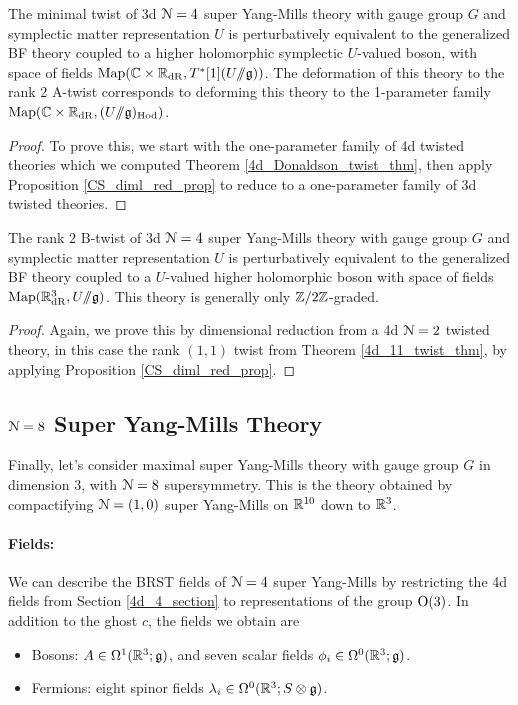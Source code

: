 \documentclass[10pt, oneside]{article}
\newcommand{\ham}{/\!\!/}
\begin{document}
\begin{theorem} \label{3d_4_holo_A_twist_thm}
The minimal twist of 3d $\mathcal{N}=4$ super Yang-Mills theory with gauge group $G$ and symplectic matter representation $U$ is perturbatively equivalent to the generalized BF theory coupled to a higher holomorphic symplectic $U$-valued boson, with space of fields $\mr{Map}(\CC \times \RR_{\mr{dR}}, T^*[1](U\ham \gg))$. The deformation of this theory to the rank 2 A-twist corresponds to deforming this theory to the 1-parameter family $\mr{Map}(\CC \times \RR_{\mr{dR}}, (U\ham \gg)_{\mr{Hod}})$.
\end{theorem}

\begin{proof}
To prove this, we start with the one-parameter family of 4d twisted theories which we computed Theorem \ref{4d_Donaldson_twist_thm}, then apply Proposition \ref{CS_diml_red_prop} to reduce to a one-parameter family of 3d twisted theories.
\end{proof}

\begin{theorem} \label{3d_2_B_twist_thm}
The rank $2$ B-twist of 3d $\mathcal{N}=4$ super Yang-Mills theory with gauge group $G$ and symplectic matter representation $U$ is perturbatively equivalent to the generalized BF theory coupled to a $U$-valued higher holomorphic boson with space of fields $\mr{Map}(\RR^3_{\mr{dR}}, U\ham \gg)$.  This theory is generally only $\mathbb Z/2\mathbb Z$-graded.
\end{theorem}

\begin{proof}
Again, we prove this by dimensional reduction from a 4d $\mathcal{N}=2$ twisted theory, in this case the rank $(1,1)$ twist from Theorem \ref{4d_11_twist_thm}, by applying Proposition \ref{CS_diml_red_prop}.
\end{proof}

\subsection{\texorpdfstring{$\mathcal N = 8$}{N=8} Super Yang-Mills Theory} \label{3d_8_section}
Finally, let's consider maximal super Yang-Mills theory with gauge group $G$ in dimension 3, with $\mathcal{N}=8$ supersymmetry.  This is the theory obtained by compactifying $\mathcal{N}=(1,0)$ super Yang-Mills on $\mathbb R^{10}$ down to $\mathbb R^3$.

\vspace{-10pt}
\paragraph{Fields:} We can describe the BRST fields of $\mathcal{N}=4$ super Yang-Mills by restricting the 4d fields from Section \ref{4d_4_section} to representations of the group $\mathrm{O}(3)$.  In addition to the ghost $c$, the fields we obtain are
\begin{itemize}
 \item Bosons: $A \in \Omega^1(\mathbb R^3; \mathfrak{g})$, and seven scalar fields $\phi_i \in \Omega^0(\mathbb R^3; \mathfrak{g})$.
 \item Fermions: eight spinor fields $\lambda_i \in \Omega^0(\mathbb R^3; S \otimes \mathfrak{g})$.
\end{itemize}
\end{document}
